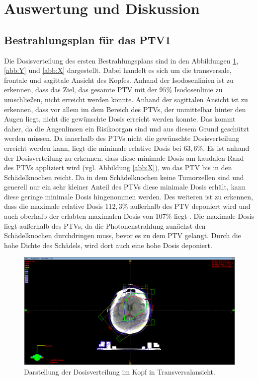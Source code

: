 \section{Auswertung und Diskussion}
\label{sec:Auswertung}

\subsection*{Bestrahlungsplan für das PTV1}

Die Dosisverteilung des ersten Bestrahlungsplans sind in den Abbildungen \ref{abb:Z}, \ref{abb:Y} und \ref{abb:X}
dargestellt. Dabei handelt es sich um die transversale, frontale und sagittale Ansicht des Kopfes.
Anhand der Isodosenlinien ist zu erkennen, dass das Ziel, das gesamte PTV mit der
$95\%$ Isodosenlinie zu umschließen, nicht erreicht werden konnte. Anhand der sagittalen Ansicht ist
zu erkennen, dass vor allem im dem Bereich des PTVs, der unmittelbar hinter den Augen liegt, nicht die gewünschte
Dosis erreicht werden konnte. Das kommt daher, da die Augenlinsen ein Risikoorgan sind und aus diesem Grund geschützt werden müssen.
Da innerhalb des PTVs nicht die gewünschte Dosisverteilung erreicht werden kann, liegt die minimale relative Dosis bei $63,6\%$.
Es ist anhand der Dosisverteilung zu erkennen, dass diese minimale Dosis am kaudalen Rand des PTVs appliziert wird
(vgl. Abbildung \ref{abb:X}), wo das PTV bis in den Schädelknochen reicht. Da in dem Schädelknochen keine Tumorzellen sind und generell nur ein
sehr kleiner Anteil des PTVs diese minimale Dosis erhält, kann diese geringe minimale
Dosis hingenommen werden.
Des weiteren ist zu erkennen, dass die maximale relative Dosis $112,3\%$ außerhalb des PTV deponiert wird und auch oberhalb der erlabten
maximalen Dosis von $107\%$ liegt \cite{ICRU}. Die maximale Dosis liegt außerhalb des PTVs, da die Photonenstrahlung zunächst den Schädelknochen
durchdringen muss, bevor es zu dem PTV gelangt. Durch die hohe Dichte des Schädels, wird dort auch eine hohe Dosis deponiert.


\begin{figure}[H]
  \centering
  \includegraphics[width=\textwidth]{Bilder/Teilhirn1_Z.png}
  \caption{Darstellung der Dosisverteilung im Kopf in Transversalansicht.}
  \label{abb:Z}
\end{figure}

